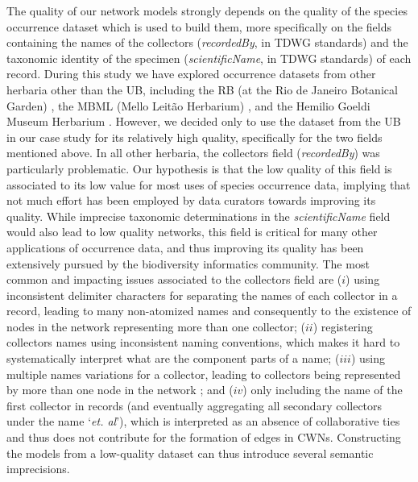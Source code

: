 The quality of our network models strongly depends on the quality of the species occurrence dataset which is used to build them, more specifically on the fields containing the names of the collectors (\textit{recordedBy}, in TDWG standards) and the taxonomic identity of the specimen (\textit{scientificName}, in TDWG standards) of each record.
%
During this study we have explored occurrence datasets from other herbaria other than the UB, including
the RB (at the Rio de Janeiro Botanical Garden) \cite{gbif_rb}, 
the MBML (Mello Leitão Herbarium) \cite{gbif_mbml},
and the Hemilio Goeldi Museum Herbarium \cite{gbif_mpegh}.
However, we decided only to use the dataset from the UB in our case study for its relatively high quality, specifically for the two fields mentioned above.
%
In all other herbaria, the collectors field (\textit{recordedBy}) was particularly problematic.
Our hypothesis is that the low quality of this field is associated to its low value for most uses of species occurrence data, implying that not much effort has been employed by data curators towards improving its quality.
While imprecise taxonomic determinations in the \textit{scientificName} field would also lead to low quality networks, this field is critical for many other applications of occurrence data, and thus improving its quality has been extensively pursued by the biodiversity informatics community.
The most common and impacting issues associated to the collectors field are 
($i$) using inconsistent delimiter characters for separating the names of each collector in a record, leading to many non-atomized names and consequently to the existence of nodes in the network representing more than one collector; 
($ii$) registering collectors names using inconsistent naming conventions, which makes it hard to systematically interpret what are the component parts of a name; 
($iii$) using multiple names variations for a collector, leading to collectors being represented by more than one node in the network ; and 
($iv$) only including the name of the first collector in records (and eventually aggregating all secondary collectors under the name `\textit{et. al}'), which is interpreted as an absence of collaborative ties and thus does not contribute for the formation of edges in CWNs.
Constructing the models from a low-quality dataset can thus introduce several semantic imprecisions. 



